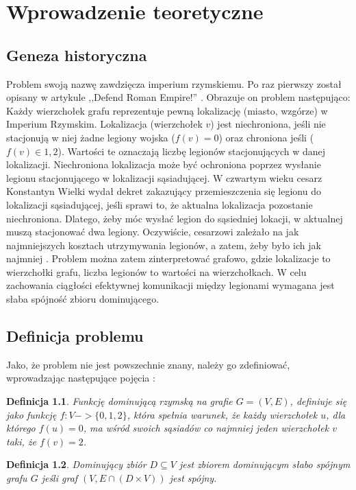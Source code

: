 \chapter{Wprowadzenie teoretyczne}

\section{Geneza historyczna}
Problem swoją nazwę zawdzięcza imperium rzymskiemu. Po raz pierwszy został opisany w artykule ,,Defend Roman Empire!'' \cite{defendRomanEmpire}.
Obrazuje on problem następująco: Każdy wierzchołek grafu reprezentuje pewną lokalizację (miasto, wzgórze) w Imperium Rzymskim. Lokalizacja (wierzchołek $v$) jest niechroniona, jeśli nie stacjonują w niej żadne legiony wojska ($f(v) = 0$) oraz chroniona jeśli ($f(v) \in {1,2} $). Wartości te oznaczają liczbę legionów stacjonujących w danej lokalizacji. Niechroniona lokalizacja może być ochroniona poprzez wysłanie legionu stacjonującego w lokalizacji sąsiadującej. W czwartym wieku cesarz Konstantyn Wielki wydał dekret zakazujący przemieszczenia się legionu do lokalizacji sąsiadującej, jeśli sprawi to, że aktualna lokalizacja pozostanie niechroniona. Dlatego, żeby móc wysłać legion do sąsiedniej lokacji, w aktualnej muszą stacjonować dwa legiony. Oczywiście, cesarzowi zależało na jak najmniejszych kosztach utrzymywania legionów, a zatem, żeby było ich jak najmniej \cite{theoryWCRDF}. Problem można zatem zinterpretować grafowo, gdzie lokalizacje to wierzchołki grafu, liczba legionów to wartości na wierzchołkach. W celu zachowania ciągłości efektywnej komunikacji między legionami wymagana jest słaba spójność zbioru dominującego.

\section{Definicja problemu}
Jako, że problem nie jest powszechnie znany, należy go zdefiniować, wprowadzając następujące pojęcia \cite{theoryWCRDF}:

\newtheorem{definition}{Definicja}

\begin{definition}
    Funkcję dominującą rzymską na grafie $G = (V, E)$, definiuje się jako funkcję $f: V -> \{0,1,2\}$, która spełnia warunek, że każdy wierzchołek $u$, dla którego $f(u) = 0$, ma wśród swoich sąsiadów co najmniej jeden wierzchołek $v$ taki, że $f(v) = 2$.
\end{definition}

\begin{definition}
    Dominujący zbiór $D \subseteq V$ jest zbiorem dominującym słabo spójnym grafu $G$ jeśli graf $(V,E \cap (D \times V))$ jest spójny.
\end{definition}

